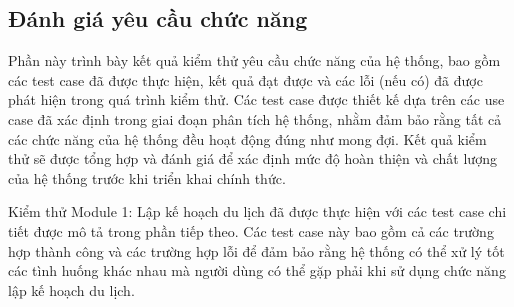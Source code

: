 \subsection{Đánh giá yêu cầu chức năng}
Phần này trình bày kết quả kiểm thử yêu cầu chức năng của hệ thống, bao gồm các test case đã được thực hiện, kết quả đạt được và các lỗi (nếu có) đã được phát hiện trong quá trình kiểm thử. Các test case được thiết kế dựa trên các use case đã xác định trong giai đoạn phân tích hệ thống, nhằm đảm bảo rằng tất cả các chức năng của hệ thống đều hoạt động đúng như mong đợi. Kết quả kiểm thử sẽ được tổng hợp và đánh giá để xác định mức độ hoàn thiện và chất lượng của hệ thống trước khi triển khai chính thức.

Kiểm thử Module 1: Lập kế hoạch du lịch đã được thực hiện với các test case chi tiết được mô tả trong phần tiếp theo. Các test case này bao gồm cả các trường hợp thành công và các trường hợp lỗi để đảm bảo rằng hệ thống có thể xử lý tốt các tình huống khác nhau mà người dùng có thể gặp phải khi sử dụng chức năng lập kế hoạch du lịch.

